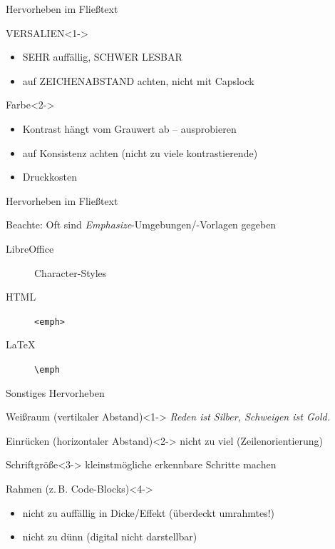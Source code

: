 \documentclass[ngerman,draft, usepdftitle=true]{beamer}
\newcommand*{\code}[1]{\texttt{#1}}
\begin{document}
\begin{frame}[t]{Hervorheben im Fließtext}
  \begin{block}{\uppercase{Versalien}}<1->
    \begin{itemize}
    \item \uppercase{sehr} auffällig, \uppercase{schwer lesbar}
    \item auf \uppercase{Zeichenabstand} achten, nicht mit Capslock
    \end{itemize}
  \end{block}
  \begin{block}{Farbe}<2->
    \begin{itemize}
    \item {\color{green}Kontrast} hängt vom Grauwert ab – ausprobieren
    \item auf {\color{green}Konsistenz} achten (nicht zu viele kontrastierende)
    \item Druckkosten
    \end{itemize}
  \end{block}  
\end{frame}

\begin{frame}{Hervorheben im Fließtext}
  \begin{alertblock}{Beachte:}
    Oft sind \emph{Emphasize}-Umgebungen/-Vorlagen
    gegeben\\
    \begin{description}
    \item[LibreOffice] Character-Styles
    \item[HTML] \code{<emph>}
    \item[\LaTeX] \code{\textbackslash emph}
    \end{description}
  \end{alertblock}
\end{frame}

\begin{frame}{Sonstiges Hervorheben}
\begin{block}{Weißraum (vertikaler Abstand)}<1->
  \emph{Reden ist Silber, Schweigen ist Gold.}
\end{block}
\begin{block}{Einrücken (horizontaler Abstand)}<2->
  nicht zu viel (Zeilenorientierung)
\end{block}
\begin{block}{Schriftgröße}<3->
  kleinstmögliche erkennbare Schritte machen
\end{block}
\begin{block}{Rahmen (z.\,B. Code-Blocks)}<4->
  \begin{itemize}
  \item nicht zu auffällig in Dicke/Effekt (überdeckt umrahmtes!)
  \item nicht zu dünn (digital nicht darstellbar)
  \end{itemize}
  \fbox{CSS: \code{border}}
\end{block}
\end{frame}
\end{document}
